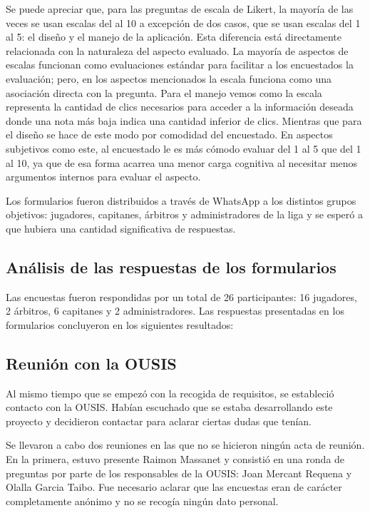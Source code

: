 Se puede apreciar que, para las preguntas de escala de Likert, la mayoría de las veces se usan escalas del al 10 a excepción de dos casos, que se usan escalas del 1 al 5: el diseño y el manejo de la aplicación. Esta diferencia está directamente relacionada con la naturaleza del aspecto evaluado. La mayoría de aspectos de escalas funcionan como evaluaciones estándar para facilitar a los encuestados la evaluación; pero, en los aspectos mencionados la escala funciona como una asociación directa con la pregunta. Para el manejo vemos como la escala representa la cantidad de clics necesarios para acceder a la información deseada donde una nota más baja indica una cantidad inferior de clics. Mientras que para el diseño se hace de este modo por comodidad del encuestado. En aspectos subjetivos como este, al encuestado le es más cómodo evaluar del 1 al 5 que del 1 al 10, ya que de esa forma acarrea una menor carga cognitiva al necesitar menos argumentos internos para evaluar el aspecto.

Los formularios fueron distribuidos a través de WhatsApp a los distintos grupos objetivos: jugadores, capitanes, árbitros y administradores de la liga y se esperó a que hubiera una cantidad significativa de respuestas.

\subsection{Análisis de las respuestas de los formularios}

Las encuestas fueron respondidas por un total de 26 participantes: 16 jugadores, 2 árbitros, 6 capitanes y 2 administradores. Las respuestas presentadas en los formularios concluyeron en los siguientes resultados:



\subsection{Reunión con la OUSIS}

Al mismo tiempo que se empezó con la recogida de requisitos, se estableció contacto con la \ac{OUSIS}. Habían escuchado que se estaba desarrollando este proyecto y decidieron contactar para aclarar ciertas dudas que tenían.

Se llevaron a cabo dos reuniones en las que no se hicieron ningún acta de reunión. En la primera, estuvo presente Raimon Massanet y consistió en una ronda de preguntas por parte de los responsables de la \ac{OUSIS}: Joan Mercant Requena y Olalla Garcia Taibo. Fue necesario aclarar que las encuestas eran de carácter completamente anónimo y no se recogía ningún dato personal.

